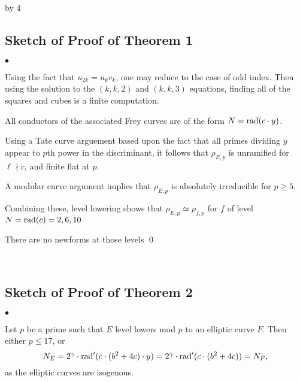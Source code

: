 \documentclass[12pt]{scrartcl}
\newenvironment{citemize}{
\begin{list}{$\bullet$}{\setlength{\itemsep}{0pt} \setlength{\rightmargin}{0pt} \setlength{\leftmargin}{0.5\labelwidth} \setlength{\topsep}{0pt}}
}{\end{list}}
\newcommand{\rad}{{\rm{rad}}}
\newcommand{\notdiv}{\nmid}
\def\anzspalten{4}
\newlength{\kastenwidth}
\newenvironment{kasten}{%
  \begin{lrbox}{\dummybox}%
    \begin{minipage}{0.96\linewidth}}%
    {\end{minipage}%
  \end{lrbox}%
  \raisebox{-\depth}{\psshadowbox[framesep=1em]{\usebox{\dummybox}}}\\[0.5em]}
\newenvironment{spalte}{%
  \setlength\kastenwidth{1.2\textwidth}
  \divide\kastenwidth by \anzspalten
  \begin{minipage}[t]{\kastenwidth}}{\end{minipage}\hfill}
\begin{document}
\begin{lrbox}{\spalten}
{\begin{spalte}
\begin{kasten}

\subsection*{\color{blue} Sketch of Proof of Theorem 1}

\begin{citemize}

\item Using the fact that $u_{2k} = u_kv_k$, one may reduce to the case of odd index.  Then using the solution to the $(k,k,2)$ and $(k,k, 3)$ equations, finding all of the squares and cubes is a finite computation.

\item All conductors of the associated Frey curves are of the form $N = \rad(c \cdot y)$.

\item Using a Tate curve arguement based upon the fact that all primes dividing $y$ appear to $p$th power in the discriminant, it follows that $\rho_{E,p}$ is unramified for $\ell \notdiv c$, and finite flat at $p$.

\item A modular curve argument implies that $\rho_{E,p}$ is absolutely irreducible for $p \geq 5$.

\item Combining these, level lowering shows that $\rho_{E,p} \simeq \rho_{f,p}$ for $f$ of level $N = \rad(c) = 2,6,10$

\item There are no newforms at those levels \qed

\end{citemize}

\end{kasten}

\begin{kasten}

\subsection*{\color{blue} Sketch of Proof of Theorem 2}

\begin{citemize}

\item Let $p$ be a prime such that $E$ level lowers mod $p$ to an elliptic curve $F$.  Then either $p \leq 17$, or
\[ N_E = 2^\gamma \cdot \rad'(c \cdot (b^2+4c)\cdot y) = 2^\gamma \cdot \rad'(c \cdot (b^2+4c)) = N_F, \]
as the elliptic curves are isogenous.


\end{citemize}
\end{kasten}
\end{spalte}}
\end{lrbox}
\end{document}
